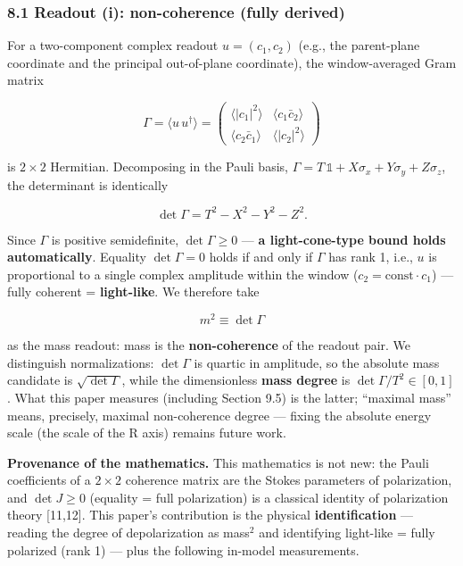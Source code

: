 \documentclass[
  a4paper,
]{article}
\begin{document}
\subsubsection{8.1 Readout (i): non-coherence (fully
derived)}\label{readout-i-non-coherence-fully-derived}

For a two-component complex readout \(u=(c_1, c_2)\) (e.g., the
parent-plane coordinate and the principal out-of-plane coordinate), the
window-averaged Gram matrix

\[\Gamma = \langle u\,u^\dagger\rangle = \begin{pmatrix} \langle|c_1|^2\rangle & \langle c_1\bar c_2\rangle \\ \langle c_2\bar c_1\rangle & \langle|c_2|^2\rangle \end{pmatrix}\]

is \(2\times2\) Hermitian. Decomposing in the Pauli basis,
\(\Gamma = T\,\mathbb{1} + X\sigma_x + Y\sigma_y + Z\sigma_z\), the
determinant is identically

\[\det\Gamma = T^2 - X^2 - Y^2 - Z^2.\]

Since \(\Gamma\) is positive semidefinite, \(\det\Gamma \ge 0\) ---
\textbf{a light-cone-type bound holds automatically}. Equality
\(\det\Gamma=0\) holds if and only if \(\Gamma\) has rank 1, i.e., \(u\)
is proportional to a single complex amplitude within the window
(\(c_2 = \text{const}\cdot c_1\)) --- fully coherent =
\textbf{light-like}. We therefore take

\[m^2 \equiv \det\Gamma\]

as the mass readout: mass is the \textbf{non-coherence} of the readout
pair. We distinguish normalizations: \(\det\Gamma\) is quartic in
amplitude, so the absolute mass candidate is \(\sqrt{\det\Gamma}\),
while the dimensionless \textbf{mass degree} is
\(\det\Gamma/T^2 \in [0,1]\). What this paper measures (including
Section 9.5) is the latter; ``maximal mass'' means, precisely, maximal
non-coherence degree --- fixing the absolute energy scale (the scale of
the R axis) remains future work.

\textbf{Provenance of the mathematics.} This mathematics is not new: the
Pauli coefficients of a \(2\times2\) coherence matrix are the Stokes
parameters of polarization, and \(\det J \ge 0\) (equality = full
polarization) is a classical identity of polarization theory
{[}11,12{]}. This paper's contribution is the physical
\textbf{identification} --- reading the degree of depolarization as
mass\(^2\) and identifying light-like = fully polarized (rank 1) ---
plus the following in-model measurements.
\end{document}
